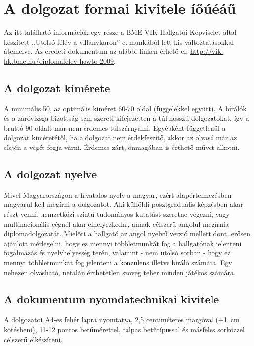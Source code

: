 \chapter{A dolgozat formai kivitele íőúéáű}
Az itt található információk egy része a BME VIK Hallgatói Képviselet által készített ,,Utolsó félév a villanykaron'' c. munkából lett kis változtatásokkal átemelve. Az eredeti dokumentum az alábbi linken érhető el: \url{http://vik-hk.bme.hu/diplomafelev-howto-2009}.

\section{A dolgozat kimérete}
A minimális 50, az optimális kiméret 60-70 oldal (függelékkel együtt). A bírálók és a záróvizsga bizottság sem szereti kifejezetten a túl hosszú dolgozatokat, így a bruttó 90 oldalt már nem érdemes túlszárnyalni. Egyébként függetlenül a dolgozat kiméretétől, ha a dolgozat nem érdekfeszítő, akkor az olvasó már az elején a végét fogja várni. Érdemes zárt, önmagában is érthető művet alkotni.

\section{A dolgozat nyelve}
Mivel Magyarországon a hivatalos nyelv a magyar, ezért alapértelmezésben magyarul kell megírni a dolgozatot. Aki külföldi posztgraduális képzésben akar részt venni, nemzetközi szintű tudományos kutatást szeretne végezni, vagy multinacionális cégnél akar elhelyezkedni, annak célszerű angolul megírnia diplomadolgozatát. Mielőtt a hallgató az angol nyelvű verzió mellett dönt, erősen ajánlott mérlegelni, hogy ez mennyi többletmunkát fog a hallgatónak jelenteni fogalmazás és nyelvhelyesség terén, valamint - nem utolsó sorban - hogy ez mennyi többletmunkát fog jelenteni a konzulens illetve bíráló számára. Egy nehezen olvasható, netalán érthetetlen szöveg teher minden játékos számára.

\section{A dokumentum nyomdatechnikai kivitele}
A dolgozatot A4-es fehér lapra nyomtatva, 2,5 centiméteres margóval (+1~cm kötésbeni), 11-12 pontos betűmérettel, talpas betűtípussal és másfeles sorközzel célszerű elkészíteni.


